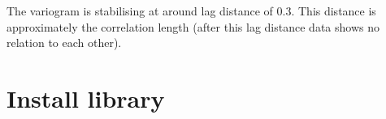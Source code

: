 \documentclass[10pt]{book}
\begin{document}
{The variogram is stabilising at around lag distance of 0.3. This distance is approximately the correlation length (after this lag distance data shows no relation to each other). 





%
%
%
%
%

\appendix

\chapter{Install library}
}
\end{document}
